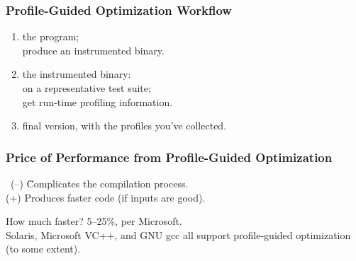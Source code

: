 \documentclass[aspectratio=43]{beamer}
\newenvironment{changemargin}[1]{%
  \begin{list}{}{%
    \setlength{\topsep}{0pt}%
    \setlength{\leftmargin}{#1}%
    \setlength{\rightmargin}{1em}
    \setlength{\listparindent}{\parindent}%
    \setlength{\itemindent}{\parindent}%
    \setlength{\parsep}{\parskip}%
  }%
  \item[]}{\end{list}}
\begin{document}
\begin{frame}
  \frametitle{Profile-Guided Optimization Workflow}

  \begin{changemargin}{2cm}
\begin{enumerate}
\item {} the program; \\
\hspace*{1em} produce an instrumented binary.
\item {} the instrumented binary:\\
\hspace*{1em} on a representative test suite;\\
\hspace*{1em} get run-time profiling information.\\
\item {} final version, with the profiles you've
collected.
\end{enumerate}

  \end{changemargin}

\end{frame}

\begin{frame}
  \frametitle{Price of Performance from Profile-Guided Optimization}
  \begin{changemargin}{2cm}
\begin{tabbing}
    ~\!(--) \hspace*{.4em} \= Complicates the compilation process.\\
    (+) \> Produces faster code (if inputs are good).\\[1em]
\end{tabbing}

    How much faster? 5--25\%, per Microsoft.\\[1em]

 Solaris, Microsoft VC++, and GNU gcc all
 support profile-guided optimization (to some extent).

  \end{changemargin}

\end{frame}
\end{document}
